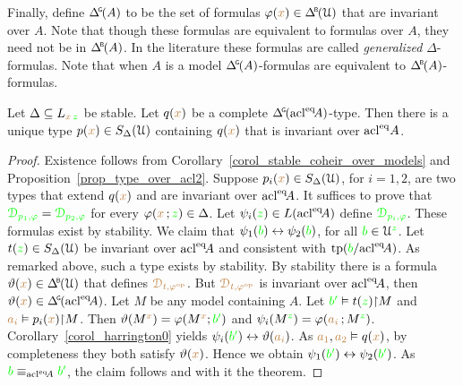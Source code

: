 Finally, define \emph{$\GDelta(A)$\/} to be the set of formulas $\phi({\mr x})\in\BDelta(\U)$ that are invariant over $A$.
Note that though these formulas are equivalent to formulas over $A$, they need not be in $\BDelta(A)$.
In the literature these formulas are called \textit{generalized\/} $\Delta$-formulas.
Note that when $A$ is a model $\GDelta(A)$-formulas are equivalent to $\BDelta(A)$-formulas.

\begin{theorem}[ (Stationarity)]\label{thm_stationarity}
  Let $\Delta\subseteq L_{{\color{brown} x}\,{\color{green} z}}$ be stable.
  Let $q({\color{brown} x})$ be a complete $\GDelta(\acl^\eq\!A)$-type.
  Then there is a unique type $p({\color{brown} x})\in S_\Delta(\EuScript U)$ containing $q({\color{brown} x})$ that is invariant over ${\rm acl}^{{\rm eq}} A$.
\end{theorem}

\begin{proof}
  Existence follows from Corollary~\ref{corol_stable_coheir_over_models} and Proposition~\ref{prop_type_over_acl2}.
  Suppose $p_i({\color{brown} x})\in S_\Delta(\EuScript U)$, for $i=1,2$, are two types that extend $q({\color{brown} x})$ and are invariant over ${\rm acl}^{{\rm eq}}\!A$.
  It suffices to prove that ${\color{green}\EuScript D_{p_1,\varphi}}={\color{green}\EuScript D_{p_2,\varphi}}$ for every $\varphi({\color{brown} x}\,;{\color{green} z})\in\Delta$.
  Let $\psi_i({\color{green} z})\in L({\rm acl}^{{\rm eq}}\!A)$ define ${\color{green}\EuScript D_{p_i,\varphi}}$.
  These formulas exist by stability.
  We claim that $\psi_1({\color{green} b})\leftrightarrow\psi_2({\color{green} b})$, for all ${\color{green} b}\in\EuScript U^{\color{green} z}$.
  Let $t({\color{green} z})\in S_\Delta(\EuScript U)$ be invariant over ${\rm acl}^{{\rm eq}}\!A$ and consistent with ${\rm tp}({\color{green} b}/{\rm acl}^{{\rm eq}}\!A)$.
  As remarked above, such a type exists by stability.
  By stability there is a formula $\theta({\mr x})\in\BDelta(\U)$ that defines ${\color{brown}\EuScript D_{t,\varphi^{\rm op}}}$.
  But ${\color{brown}\EuScript D_{t,\varphi^{\rm op}}}$ is invariant over ${\rm acl}^{{\rm eq}}\!A$, then $\theta({\mr x})\in\GDelta(\acl^\eq\!A)$.
  Let $M$ be any model containing $A$.
  Let ${\color{green} b'}\vDash t({\color{green} z}){\restriction}M$ and ${\color{brown} a_i}\vDash p_i({\color{brown} x}){\restriction}M$.
  Then $\vartheta(M^{\color{brown} x})=\varphi(M^{\color{brown} x};{\color{green} b'})$ and $\psi_i(M^{\color{green} z})=\varphi({\color{brown} a_i}\,;M^{\color{green} z})$.
  Corollary~\ref{corol_harrington0} yields $\psi_i({\color{green} b'})\leftrightarrow\vartheta({\color{brown} a_i})$.
  As ${\color{brown} a_1},{\color{brown} a_2}\vDash q({\color{brown} x})$, by completeness they both satisfy $\vartheta({\color{brown} x})$. 
  Hence we obtain $\psi_1({\color{green} b'})\leftrightarrow\psi_2({\color{green} b'})$.
  As ${\color{green} b}\equiv_{{\rm acl}^{{\rm eq}}\!A}{\color{green} b'}$, the claim follows and with it the theorem.
\end{proof}


